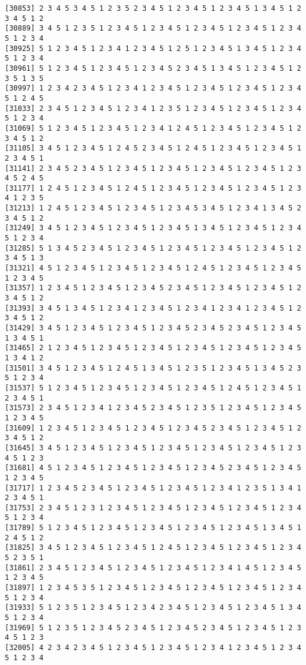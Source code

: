\documentclass[
  11pt,
]{book}
\begin{document}
\begin{verbatim}
[30853] 2 3 4 5 3 4 5 1 2 3 5 2 3 4 5 1 2 3 4 5 1 2 3 4 5 1 3 4 5 1 2 3 4 5 1 2
[30889] 3 4 5 1 2 3 5 1 2 3 4 5 1 2 3 4 5 1 2 3 4 5 1 2 3 4 5 1 2 3 4 5 1 2 3 4
[30925] 5 1 2 3 4 5 1 2 3 4 1 2 3 4 5 1 2 5 1 2 3 4 5 1 3 4 5 1 2 3 4 5 1 2 3 4
[30961] 5 1 2 3 4 5 1 2 3 4 5 1 2 3 4 5 2 3 4 5 1 3 4 5 1 2 3 4 5 1 2 3 5 1 3 5
[30997] 1 2 3 4 2 3 4 5 1 2 3 4 1 2 3 4 5 1 2 3 4 5 1 2 3 4 5 1 2 3 4 5 1 2 4 5
[31033] 2 3 4 5 1 2 3 4 5 1 2 3 4 1 2 3 5 1 2 3 4 5 1 2 3 4 5 1 2 3 4 5 1 2 3 4
[31069] 5 1 2 3 4 5 1 2 3 4 5 1 2 3 4 1 2 4 5 1 2 3 4 5 1 2 3 4 5 1 2 3 4 5 1 2
[31105] 3 4 5 1 2 3 4 5 1 2 4 5 2 3 4 5 1 2 4 5 1 2 3 4 5 1 2 3 4 5 1 2 3 4 5 1
[31141] 2 3 4 5 2 3 4 5 1 2 3 4 5 1 2 3 4 5 1 2 3 4 5 1 2 3 4 5 1 2 3 4 5 2 4 5
[31177] 1 2 4 5 1 2 3 4 5 1 2 4 5 1 2 3 4 5 1 2 3 4 5 1 2 3 4 5 1 2 3 4 1 2 3 5
[31213] 1 2 4 5 1 2 3 4 5 1 2 3 4 5 1 2 3 4 5 3 4 5 1 2 3 4 1 3 4 5 2 3 4 5 1 2
[31249] 3 4 5 1 2 3 4 5 1 2 3 4 5 1 2 3 4 5 1 3 4 5 1 2 3 4 5 1 2 3 4 5 1 2 3 4
[31285] 5 1 3 4 5 2 3 4 5 1 2 3 4 5 1 2 3 4 5 1 2 3 4 5 1 2 3 4 5 1 2 3 4 5 1 3
[31321] 4 5 1 2 3 4 5 1 2 3 4 5 1 2 3 4 5 1 2 4 5 1 2 3 4 5 1 2 3 4 5 1 2 3 4 5
[31357] 1 2 3 4 5 1 2 3 4 5 1 2 3 4 5 2 3 4 5 1 2 3 4 5 1 2 3 4 5 1 2 3 4 5 1 2
[31393] 3 4 5 1 3 4 5 1 2 3 4 1 2 3 4 5 1 2 3 4 1 2 3 4 1 2 3 4 5 1 2 3 4 5 1 2
[31429] 3 4 5 1 2 3 4 5 1 2 3 4 5 1 2 3 4 5 2 3 4 5 2 3 4 5 1 2 3 4 5 1 3 4 5 1
[31465] 2 1 2 3 4 5 1 2 3 4 5 1 2 3 4 5 1 2 3 4 5 1 2 3 4 5 1 2 3 4 5 1 3 4 1 2
[31501] 3 4 5 1 2 3 4 5 1 2 4 5 1 3 4 5 1 2 3 5 1 2 3 4 5 1 3 4 5 2 3 5 1 2 3 4
[31537] 5 1 2 3 4 5 1 2 3 4 5 1 2 3 4 5 1 2 3 4 5 1 2 4 5 1 2 3 4 5 1 2 3 4 5 1
[31573] 2 3 4 5 1 2 3 4 1 2 3 4 5 2 3 4 5 1 2 3 5 1 2 3 4 5 1 2 3 4 5 1 2 3 4 5
[31609] 1 2 3 4 5 1 2 3 4 5 1 2 3 4 5 1 2 3 4 5 2 3 4 5 1 2 3 4 5 1 2 3 4 5 1 2
[31645] 3 4 5 1 2 3 4 5 1 2 3 4 5 1 2 3 4 5 1 2 3 4 5 1 2 3 4 5 1 2 3 4 5 1 2 3
[31681] 4 5 1 2 3 4 5 1 2 3 4 5 1 2 3 4 5 1 2 3 4 5 2 3 4 5 1 2 3 4 5 1 2 3 4 5
[31717] 1 2 3 4 5 2 3 4 5 1 2 3 4 5 1 2 3 4 5 1 2 3 4 1 2 3 5 1 3 4 1 2 3 4 5 1
[31753] 2 3 4 5 1 2 3 1 2 3 4 5 1 2 3 4 5 1 2 3 4 5 1 2 3 4 5 1 2 3 4 5 1 2 3 4
[31789] 5 1 2 3 4 5 1 2 3 4 5 1 2 3 4 5 1 2 3 4 5 1 2 3 4 5 1 3 4 5 1 2 4 5 1 2
[31825] 3 4 5 1 2 3 4 5 1 2 3 4 5 1 2 4 5 1 2 3 4 5 1 2 3 4 5 1 2 3 4 5 2 3 5 1
[31861] 2 3 4 5 1 2 3 4 5 1 2 3 4 5 1 2 3 4 5 1 2 3 4 1 4 5 1 2 3 4 5 1 2 3 4 5
[31897] 1 2 3 4 5 3 5 1 2 3 4 5 1 2 3 4 5 1 2 3 4 5 1 2 3 4 5 1 2 3 4 5 1 2 3 4
[31933] 5 1 2 3 5 1 2 3 4 5 1 2 3 4 2 3 4 5 1 2 3 4 5 1 2 3 4 5 1 3 4 5 1 2 3 4
[31969] 5 1 2 3 5 1 2 3 4 5 2 3 4 5 1 2 3 4 5 2 3 4 5 1 2 3 4 5 1 2 3 4 5 1 2 3
[32005] 4 2 3 4 2 3 4 5 1 2 3 4 5 1 2 3 4 5 1 2 3 4 1 2 3 4 5 1 2 3 4 5 1 2 3 4

\end{verbatim}
\end{document}
